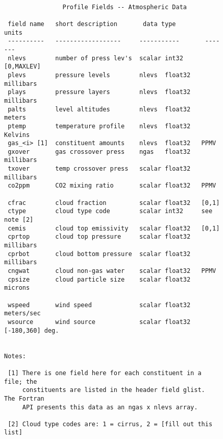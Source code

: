 \documentclass[12pt]{article}
\begin{document}
\begin{figure}
{\small
\begin{verbatim}

                Profile Fields -- Atmospheric Data

 field name   short description       data type         units
 ----------   ------------------     -----------       -------
 nlevs        number of press lev's  scalar int32     [0,MAXLEV]
 plevs        pressure levels        nlevs  float32   millibars
 plays        pressure layers        nlevs  float32   millibars
 palts        level altitudes        nlevs  float32   meters
 ptemp        temperature profile    nlevs  float32   Kelvins
 gas_<i> [1]  constituent amounts    nlevs  float32   PPMV
 gxover       gas crossover press    ngas   float32   millibars
 txover       temp crossover press   scalar float32   millibars
 co2ppm       CO2 mixing ratio       scalar float32   PPMV

 cfrac        cloud fraction         scalar float32   [0,1]
 ctype        cloud type code        scalar int32     see note [2]
 cemis        cloud top emissivity   scalar float32   [0,1]
 cprtop       cloud top pressure     scalar float32   millibars
 cprbot       cloud bottom pressure  scalar float32   millibars
 cngwat       cloud non-gas water    scalar float32   PPMV
 cpsize       cloud particle size    scalar float32   microns

 wspeed       wind speed             scalar float32   meters/sec
 wsource      wind source            scalar float32   [-180,360] deg.


Notes:

 [1] There is one field here for each constituent in a file; the 
     constituents are listed in the header field glist.  The Fortran 
     API presents this data as an ngas x nlevs array.

 [2] Cloud type codes are: 1 = cirrus, 2 = [fill out this list]

\end{verbatim}
}
\end{figure}
\end{document}
